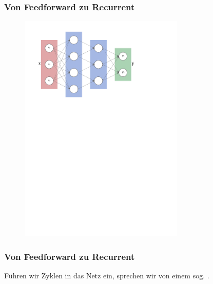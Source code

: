 \documentclass[german,aspectratio=169]{beamer}
\begin{document}
\begin{frame}
	\frametitle{Von Feedforward zu Recurrent}
	
	\begin{figure}
		\includegraphics[width=0.7\textwidth]{fnn.pdf}
	\end{figure}
	
\end{frame}

\begin{frame}
	\frametitle{Von Feedforward zu Recurrent}
	Führen wir Zyklen in das Netz ein, sprechen wir von einem sog. .
\end{frame}
\end{document}
